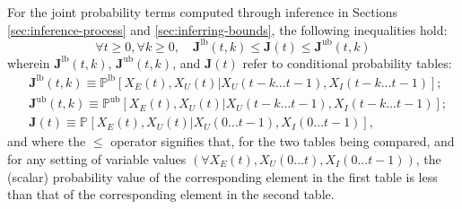 \documentclass[10pt]{article}
\newcommand{\PP}[2][]{\mathbb{P\!}_{#1}\left[#2\right]}
\newcommand{\PPlb}[2][]{\mathbb{P}^\text{lb}_{#1}\left[#2\right]}
\newcommand{\PPub}[2][]{\mathbb{P}^\text{ub}_{#1}\left[#2\right]}
\begin{document}
\begin{theorem}
\label{thm:bounds-on-joint-probability}
For the joint probability terms computed through inference in Sections \ref{sec:inference-process} and \ref{sec:inferring-bounds},
the following inequalities hold:
\begin{equation*}
\forall t\geq0, \forall k\geq0,\quad \boldsymbol{J}^\text{lb}(t,k) \leq \boldsymbol{J}(t) \leq \boldsymbol{J}^\text{ub}(t,k) 
\end{equation*}
wherein $\boldsymbol{J}^\text{lb}(t,k)$, $\boldsymbol{J}^\text{ub}(t,k)$, and $\boldsymbol{J}(t)$ refer to conditional probability tables:
\begin{align*}
&\boldsymbol{J}^\text{lb}(t,k)\equiv \PPlb{X_{E}(t),X_{U}(t)|X_{U}(t\!-\!k\ldots t\!-\!1),X_{I}(t\!-\!k\ldots t\!-\!1)};\\
&\boldsymbol{J}^\text{ub}(t,k)\equiv \PPub{X_{E}(t),X_{U}(t)|X_{U}(t\!-\!k\ldots t\!-\!1),X_{I}(t\!-\!k\ldots t\!-\!1)};\\
&\boldsymbol{J}(t)\equiv \PP{X_{E}(t),X_{U}(t)|X_{U}(0\ldots t\!-\!1),X_{I}(0\ldots t\!-\!1)},
\end{align*}
and where the $\leq$ operator signifies that, for the two tables being compared, and for any setting of variable values $\left(\forall X_{E}(t),X_{U}(0\ldots t),X_{I}(0\ldots t\!-\!1)\right)$, the (scalar) probability value of the corresponding element in the first table is less than that of the corresponding element in the second table.
\end{theorem}
\end{document}
